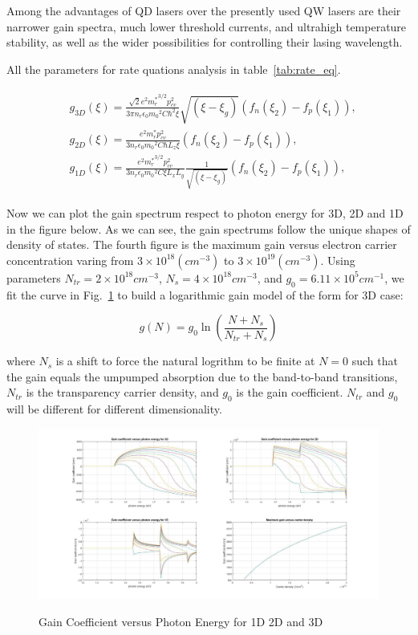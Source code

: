 Among the advantages of QD lasers over the presently used QW lasers are their
narrower gain spectra, much lower threshold currents, and ultrahigh temperature
stability, as well as the wider possibilities for controlling their lasing
wavelength.

All the parameters for rate quations analysis in table~\ref{tab:rate_eq}.



\begin{eqnarray}
\begin{aligned}
  & g_{3D}(\xi)=\frac{\sqrt{2}e^2{m_r^\ast}^{3/2}{p_{cv}^2}}{3{\pi}n_r\epsilon_0{m_0}^2C{\hbar^2}\xi}{\sqrt{(\xi-\xi_g)}}(f_n(\xi_2)-f_p(\xi_1)),
\\
& g_{2D}(\xi)=\frac{e^2{m_r^\ast}{p_{cv}^2}}{3{n_r}\epsilon_0{m_0}^2C{\hbar}L_z\xi}(f_n(\xi_2)-f_p(\xi_1)),
\\
& g_{1D}(\xi)=\frac{e^2{m_r^\ast}^{3/2}{p_{cv}^2}}{3{n_r}\epsilon_0{m_0}^2C\xi{L_x}{L_y}}\frac{1}{\sqrt{(\xi-\xi_g)}}(f_n(\xi_2)-f_p(\xi_1)),
\end{aligned}
\label{eq:five}
\end{eqnarray}

Now we can plot the gain spectrum respect to photon energy for 3D, 2D and 1D in
the figure below. As we can see, the gain spectrums follow the unique shapes of
density of states. The fourth figure is the maximum gain versus electron
carrier concentration varing from $3\times10^{18} (cm^{-3})$ to
$3\times10^{19}(cm^{-3})$. Using parameters $N_{tr} = 2\times10^{18} cm^{-3}$,
$N_{s} = 4\times10^{18} cm^{-3}$, and $g_0 = 6.11\times10^{5} cm^{-1}$, we fit
the curve in Fig.~\ref{gainspectrum} to build a logarithmic gain model of the
form for 3D case:

\begin{equation}
  g(N) = g_0\ln\left(\frac{N+N_s}{N_{tr}+ N_s}\right)
\end{equation}

where $N_s$ is a shift to force the natural logrithm to be finite at $N = 0$
such that the gain equals the umpumped absorption due to the band-to-band
transitions, $N_{tr}$ is the transparency carrier density, and $g_0$ is the
gain coefficient. $N_{tr}$ and $g_0$ will be different for different
dimensionality.

\begin{figure}
  \caption{Gain Coefficient versus Photon Energy for 1D 2D and 3D}
  \centering
  \includegraphics[width=\textwidth]{pictures/LT/gainspectrum}
  \label{gainspectrum}
\end{figure}


